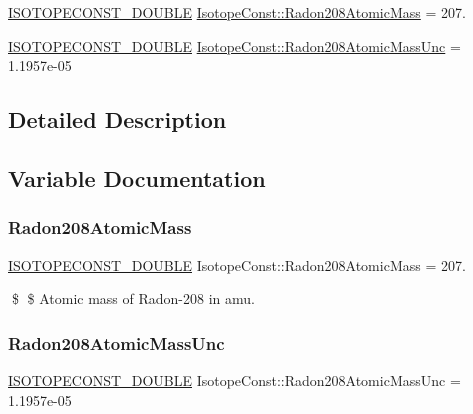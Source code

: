 \begin{DoxyCompactItemize}
\item 
\mbox{\hyperlink{group___isotope_const-_macros_ga8f45a7272ce02c0b4c65c44636ed719a}{I\+S\+O\+T\+O\+P\+E\+C\+O\+N\+S\+T\+\_\+\+D\+O\+U\+B\+LE}} \mbox{\hyperlink{group___isotope_const-_radon-_rn208_ga1f46fb7d572d97cae8adeef885c87950}{Isotope\+Const\+::\+Radon208\+Atomic\+Mass}} = 207.
\item 
\mbox{\hyperlink{group___isotope_const-_macros_ga8f45a7272ce02c0b4c65c44636ed719a}{I\+S\+O\+T\+O\+P\+E\+C\+O\+N\+S\+T\+\_\+\+D\+O\+U\+B\+LE}} \mbox{\hyperlink{group___isotope_const-_radon-_rn208_gaa6f5f1d2dc7bb8c7aeb6c0fb1d6e8e95}{Isotope\+Const\+::\+Radon208\+Atomic\+Mass\+Unc}} = 1.\+1957e-\/05
\end{DoxyCompactItemize}


\subsection{Detailed Description}


\subsection{Variable Documentation}
\mbox{\label{group___isotope_const-_radon-_rn208_ga1f46fb7d572d97cae8adeef885c87950}} 
\subsubsection{\texorpdfstring{Radon208\+Atomic\+Mass}{Radon208AtomicMass}}
{\footnotesize\ttfamily \mbox{\hyperlink{group___isotope_const-_macros_ga8f45a7272ce02c0b4c65c44636ed719a}{I\+S\+O\+T\+O\+P\+E\+C\+O\+N\+S\+T\+\_\+\+D\+O\+U\+B\+LE}} Isotope\+Const\+::\+Radon208\+Atomic\+Mass = 207.}

\$ \$ Atomic mass of Radon-\/208 in amu. \mbox{\label{group___isotope_const-_radon-_rn208_gaa6f5f1d2dc7bb8c7aeb6c0fb1d6e8e95}} 
\subsubsection{\texorpdfstring{Radon208\+Atomic\+Mass\+Unc}{Radon208AtomicMassUnc}}
{\footnotesize\ttfamily \mbox{\hyperlink{group___isotope_const-_macros_ga8f45a7272ce02c0b4c65c44636ed719a}{I\+S\+O\+T\+O\+P\+E\+C\+O\+N\+S\+T\+\_\+\+D\+O\+U\+B\+LE}} Isotope\+Const\+::\+Radon208\+Atomic\+Mass\+Unc = 1.\+1957e-\/05}

